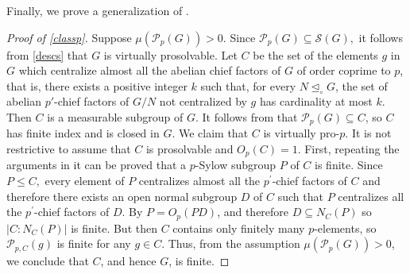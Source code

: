 \documentclass{amsart}
\newcommand{\la}{\langle}
\newcommand{\ra}{\rangle}
\numberwithin{equation}{section}
\begin{document}
Finally, we prove a generalization of \cite[Theorem 29]{pel}.

\begin{proof}[Proof of \cref{classp}]Suppose $\mu(\mathcal P_p(G))>0$. Since $\mathcal P_p(G)\subseteq \mathcal S(G),$ it follows from \cref{descs} that $G$  is virtually prosolvable.
Let $C$ be the set of the elements $g$ in $G$ which centralize almost all the abelian chief factors of $G$ of order coprime to $p$, that is, there exists a positive integer $k$ such that, for every $N \unlhd_{\circ} G$, the set of abelian $p'$-chief factors of $G/N$ not centralized by $g$ has cardinality at most $k$. Then $C$ is a measurable subgroup of $G$. It follows from \cite[Corollary 24]{pel} that $\mathcal P_p(G)\subseteq C$, so $C$ has finite index and is closed in $G$. We claim that $C$ is virtually pro-$p.$ It is not restrictive to assume that $C$ is prosolvable and $O_p(C)=1.$ First, repeating the  arguments in \cite[Theorems 29 and 30]{pel} it can be proved that a $p$-Sylow subgroup $P$ of $C$ is finite. Since $P\leq C,$ every element of $P$ centralizes almost all the $p^\prime$-chief factors of $C$ and therefore there exists an open  normal subgroup $D$ of $C$ such that $P$ centralizes all  the $p^\prime$-chief factors of $D$. By \cite[Corollary 26]{pel} $P = O_p(PD)$, and therefore $D \subseteq N_C(P)$ so $|C:N_C(P)|$ is finite. But then $C$ contains only finitely many $p$-elements, so $\mathcal P_{p,C}(g)$
is finite for any $g \in C$. Thus, from the assumption $\mu(\mathcal P_p(G))>0$, we conclude that $C$, and hence $G$, is finite.
\end{proof}


\end{document}

